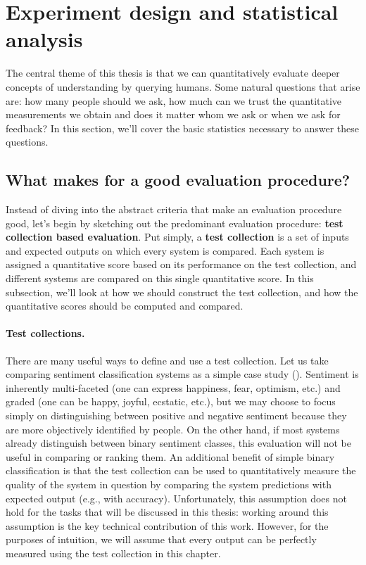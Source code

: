 \section{\label{sec:setup:statistical} Experiment design and statistical analysis}

The central theme of this thesis is that we can quantitatively evaluate deeper concepts of understanding by querying humans.
Some natural questions that arise are: how many people should we ask, how much can we trust the quantitative measurements we obtain and does it matter whom we ask or when we ask for feedback?
In this section, we'll cover the basic statistics necessary to answer these questions.

\subsection{What makes for a good evaluation procedure?}

Instead of diving into the abstract criteria that make an evaluation procedure good, let's begin by sketching out the predominant evaluation procedure: \textbf{test collection based evaluation}.
Put simply, a \textbf{test collection} is a set of inputs and expected outputs on which every system is compared.
Each system is assigned a quantitative score based on its performance on the test collection, and different systems are compared on this single quantitative score.
In this subsection, we'll look at how we should construct the test collection, and how the quantitative scores should be computed and compared.

\paragraph{Test collections.}
There are many useful ways to define and use a test collection.
Let us take comparing sentiment classification systems as a simple case study ().
Sentiment is inherently multi-faceted (one can express happiness, fear, optimism, etc.) and graded (one can be happy, joyful, ecstatic, etc.), but we may choose to focus simply on distinguishing between positive and negative sentiment because they are more objectively identified by people.
On the other hand, if most systems already distinguish between binary sentiment classes, this evaluation will not be useful in comparing or ranking them.
An additional benefit of simple binary classification is that the test collection can be used to quantitatively measure the quality of the system in question by comparing the system predictions with expected output (e.g., with accuracy).
Unfortunately, this assumption does not hold for the tasks that will be discussed in this thesis: working around this assumption is the key technical contribution of this work. 
However, for the purposes of intuition, we will assume that every output can be perfectly measured using the test collection in this chapter.

